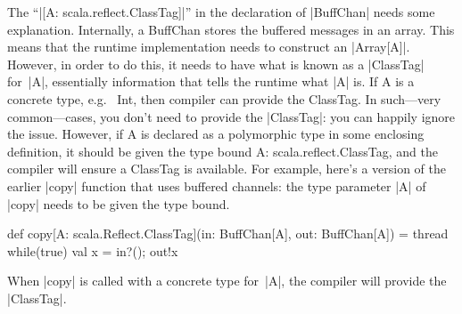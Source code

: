The ``|[A: scala.reflect.ClassTag]|'' in the declaration of |BuffChan| needs
some explanation. Internally, a {\scalashape BuffChan} stores the buffered
messages in an array.  This means that the runtime implementation needs to
construct an |Array[A]|.  However, in order to do this, it needs to have what
is known as a |ClassTag| for~|A|, essentially information that tells the
runtime what |A| is.  If {\scalashape A} is a concrete type, e.g.~{\scalashape
  Int}, then compiler can provide the {\scalashape ClassTag}.  In such---very
common---cases, you don't need to provide the |ClassTag|: you can happily
ignore the issue.  However, if {\scalashape A} is declared as a polymorphic
type in some enclosing definition, it should be given the type bound
{\scalashape A: scala.reflect.ClassTag}, and the compiler will ensure a
{\scalashape ClassTag} is available.  For example, here's a version of the
earlier |copy| function that uses buffered channels: the type parameter |A| of
|copy| needs to be given the type bound.
%
\begin{scala}
  def copy[A: scala.Reflect.ClassTag](in: BuffChan[A], out: BuffChan[A]) = thread{
    while(true){ val x = in?(); out!x }
  }
\end{scala}
%
When |copy| is called with a concrete type for~|A|, the compiler will provide
the |ClassTag|.


